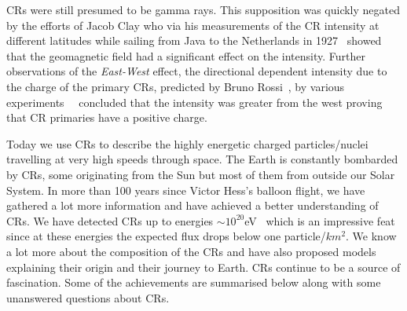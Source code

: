 \glspl{CR} were still presumed to be gamma rays. This supposition was quickly negated by the efforts of Jacob Clay who via his measurements of the \gls{CR} intensity at different latitudes while sailing from Java to the Netherlands in 1927~\cite{Clay:1927I} showed that the geomagnetic field had a significant effect on the intensity. Further observations of the \textit{East-West} effect, the directional dependent intensity due to the charge of the primary \glspl{CR}, predicted by Bruno Rossi~\cite{PhysRev.36.606}, by various experiments~\cite{PhysRev.43.834}~\cite{PhysRev.43.835} concluded that the intensity was greater from the west proving that \gls{CR} primaries have a positive charge.

Today we use \glspl{CR} to describe the highly energetic charged particles/nuclei travelling at very high speeds through space. The Earth is constantly bombarded by \glspl{CR}, some originating from the Sun but most of them from outside our Solar System. In more than 100 years since Victor Hess's balloon flight, we have gathered a lot more information and have achieved a better understanding of \glspl{CR}. We have detected \glspl{CR} up to energies $\sim 10^{20}$eV~\cite{TA_2023} which is an impressive feat since at these energies the expected flux drops below one particle/$km^2$. We know a lot more about the composition of the \glspl{CR} and have also proposed models explaining their origin and their journey to Earth. \glspl{CR} continue to be a source of fascination. Some of the achievements are summarised below along with some unanswered questions about \glspl{CR}. 

